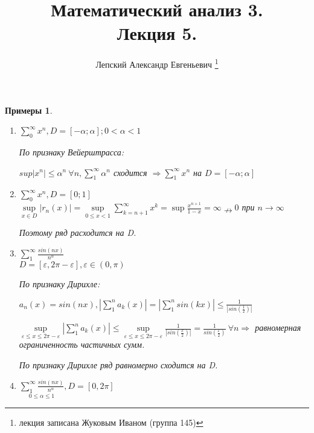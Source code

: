 \documentclass[a4paper, 12pt]{article}
\title{\vspace{-2.0cm}Математический анализ 3.\\Лекция 5.}
\author{Лепский Александр Евгеньевич
        \footnote{лекция записана Жуковым Иваном (группа 145)}}
\newtheorem{Examples}{Примеры}
\begin{document}
    \maketitle

    \begin{Examples}
    \leavevmode
        \begin{enumerate}
            \item
                \(\sum^{\infty}_{0} x^n, D =[-\alpha; \alpha]; 0 < \alpha < 1\)

                По признаку Вейерштрасса:

                \( sup \left| x^n \right|  \leqslant \alpha^n \ \forall n, 
                \sum^{\infty}_{1} \alpha^n\) сходится \( \Rightarrow
                \sum^{\infty}_{1} x^n\) на \(D = [-\alpha; \alpha]\)
            \item
                \( \sum^{\infty}_{0} x^n, D = [0; 1] \) \\
                \( \underset{x \in D}{\sup} \left| r_n(x) \right| =
                \underset{0 \leqslant x < 1}{\sup} \sum^{\infty}_{k = n + 1} 
                x^k = \sup \frac{x ^ {n + 1}}{1 - x}
                = \infty \nrightarrow 0\) при \(n \rightarrow \infty\)

                Поэтому ряд расходится на D.

            \item
                \( \sum^{\infty}_{1} \frac{sin(nx)}{n ^ \alpha}\) \\
                \( D = [\varepsilon, 2\pi - \varepsilon], \varepsilon
                \in (0, \pi)\)

                По признаку Дирихле:

                \( a_n(x) = sin(nx), \left| \sum^{n}_{1} a_k(x) \right| =
                \left| \sum^{n}_{1}sin(kx) \right|
                \leqslant \frac{1}{\left| sin(\frac{1}{2}) \right|}\)

                \( \underset{\varepsilon \leqslant x \leqslant 2\pi - \varepsilon}{\sup} 
                \left| \sum^{n}_{1} a_k(x) \right| \le
                \underset{\varepsilon \leqslant x \leqslant 2\pi - \varepsilon}{\sup}
                \frac{1}{\left| sin(\frac{x}{2}) \right|} =
                \frac{1}{sin(\frac{\varepsilon}{2})} \ \forall n \Rightarrow\)
                равномерная ограниченность частичных сумм.

                По признаку Дирихле ряд равномерно сходится на D.

            \item
                \( \underset{0 \leqslant \alpha \leqslant 1}{\sum^{\infty}_{1}
                \frac{sin(nx)}{n ^ \alpha}}, D = [0, 2\pi]\)


\end{enumerate}
\end{Examples}
\end{document}
